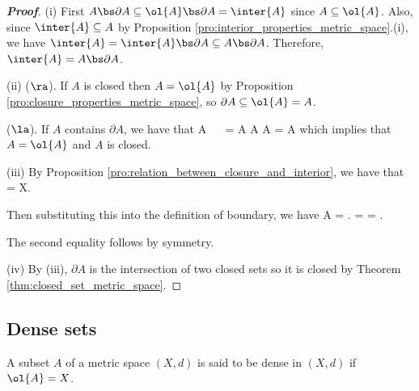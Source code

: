 \begin{proof}[\bf Proof]
\ben
\item [(i)] First $A\bs \partial A \subseteq \ol{A}\bs \partial A = \inter{A}$ since $A\subseteq \ol{A}$. Also, since $\inter{A} \subseteq A$ by Proposition \ref{pro:interior_properties_metric_space}.(i), we have $\inter{A} = \inter{A}\bs \partial A \subseteq A\bs \partial A$. Therefore, $\inter{A} = A\bs \partial A$.

\item [(ii)] ($\ra$). If $A$ is closed then $A = \ol{A}$ by Proposition \ref{pro:closure_properties_metric_space}, so $\partial A \subseteq \ol{A} = A$.

($\la$). If $A$ contains $\partial A$, we have that
\be
{} \subseteq A \ \ra\  = \cup \partial A \subseteq A \cup \partial A = A
\ee
which implies that $A = \ol{A}$ and $A$ is closed.

\item [(iii)] By Proposition \ref{pro:relation_between_closure_and_interior}, we have that
\be
{} = X\left\bs {}\right.
\ee

Then substituting this into the definition of boundary, we have
\be
\partial A =  \left\bs {}\right. =  \cap {} =  \cap {}.
\ee

The second equality follows by symmetry.

\item [(iv)] By (iii), $\partial A$ is the intersection of two closed sets so it is closed by Theorem \ref{thm:closed_set_metric_space}.
\een
\end{proof}


\subsection{Dense sets}

\begin{definition}\label{def:dense_set_metric_space}
A subset $A$ of a metric space $(X,d)$ is said to be dense in $(X,d)$ if $\ol{A} = X$.
\end{definition}





